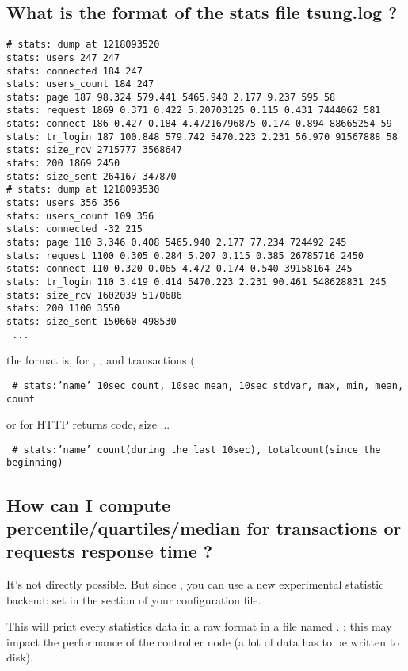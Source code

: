 \documentclass{TSUNG-en}
\begin{document}
\begin{appendix}
\subsection{What is the format of the stats file tsung.log ?}
\label{sec:what-format-stats}
\begin{Verbatim}
# stats: dump at 1218093520
stats: users 247 247
stats: connected 184 247
stats: users_count 184 247
stats: page 187 98.324 579.441 5465.940 2.177 9.237 595 58
stats: request 1869 0.371 0.422 5.20703125 0.115 0.431 7444062 581
stats: connect 186 0.427 0.184 4.47216796875 0.174 0.894 88665254 59
stats: tr_login 187 100.848 579.742 5470.223 2.231 56.970 91567888 58
stats: size_rcv 2715777 3568647
stats: 200 1869 2450
stats: size_sent 264167 347870
# stats: dump at 1218093530
stats: users 356 356
stats: users_count 109 356
stats: connected -32 215
stats: page 110 3.346 0.408 5465.940 2.177 77.234 724492 245
stats: request 1100 0.305 0.284 5.207 0.115 0.385 26785716 2450
stats: connect 110 0.320 0.065 4.472 0.174 0.540 39158164 245
stats: tr_login 110 3.419 0.414 5470.223 2.231 90.461 548628831 245
stats: size_rcv 1602039 5170686
stats: 200 1100 3550
stats: size_sent 150660 498530
 ...
\end{Verbatim}

 the format is, for , ,
  and transactions (:

 \texttt{ \# stats:'name' 10sec\_count, 10sec\_mean, 10sec\_stdvar,
   max, min, mean, count}

 or for HTTP returns code, size ...

\texttt{ \# stats:'name' count(during the last 10sec), totalcount(since the beginning)}

\subsection{How can I compute percentile/quartiles/median for transactions or requests
  response time ?}

It's not directly possible. But since , you can
use a new experimental statistic backend: set  in the
 section of your configuration file.

This will print every statistics data in a raw format in a file named
. : this may impact the performance of
the controller node (a lot of data has to be written to disk).


\end{appendix}
\end{document}
